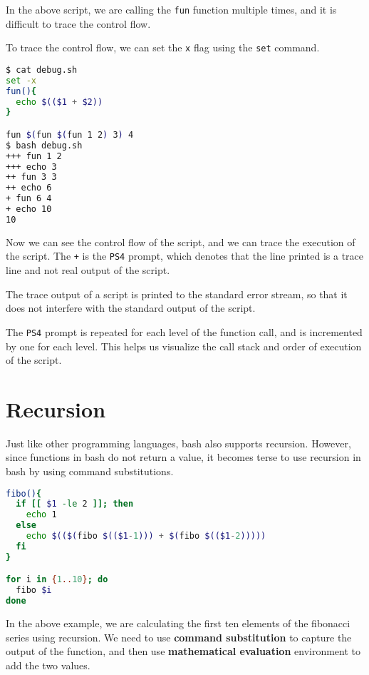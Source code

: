 In the above script, we are calling the \lstinline|fun| function multiple times, and it is difficult to trace the control flow.

To trace the control flow, we can set the \lstinline|x| flag using the \lstinline|set| command.

\begin{lstlisting}[language=bash]
$ cat debug.sh
set -x
fun(){
  echo $(($1 + $2))
}

fun $(fun $(fun 1 2) 3) 4
$ bash debug.sh
+++ fun 1 2
+++ echo 3
++ fun 3 3
++ echo 6
+ fun 6 4
+ echo 10
10
\end{lstlisting}

Now we can see the control flow of the script, and we can trace the execution of the script.
The \lstinline|+| is the \lstinline|PS4| prompt, which denotes that the line printed is a trace line and not real output of the script.

\begin{remark}
  The trace output of a script is printed to the standard error stream, so that it does not interfere with the standard output of the script.
\end{remark}

The \lstinline|PS4| prompt is repeated for each level of the function call, and is incremented by one for each level.
This helps us visualize the call stack and order of execution of the script.

\section{Recursion}

Just like other programming languages, bash also supports recursion.
However, since functions in bash do not return a value, it becomes terse to use recursion in bash by using command substitutions.

\begin{lstlisting}[language=bash]
fibo(){
  if [[ $1 -le 2 ]]; then
    echo 1
  else
    echo $(($(fibo $(($1-1))) + $(fibo $(($1-2)))))
  fi
}

for i in {1..10}; do
  fibo $i
done
\end{lstlisting}

In the above example, we are calculating the first ten elements of the fibonacci series using recursion.
We need to use \textbf{command substitution} to capture the output of the function, and then use \textbf{mathematical evaluation} environment to add the two values.

